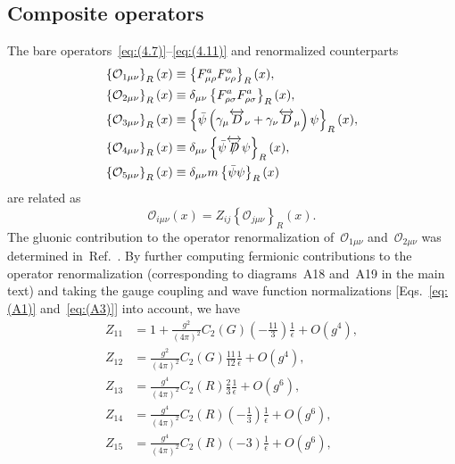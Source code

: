 \subsection{Composite operators}
The bare operators~\eqref{eq:(4.7)}--\eqref{eq:(4.11)} and renormalized
counterparts
\begin{align}
   \left\{\mathcal{O}_{1\mu\nu}\right\}_R(x)&\equiv
   \left\{F_{\mu\rho}^aF_{\nu\rho}^a\right\}_R(x),
\label{eq:(A5)}\\
   \left\{\mathcal{O}_{2\mu\nu}\right\}_R(x)&\equiv
   \delta_{\mu\nu}\left\{F_{\rho\sigma}^aF_{\rho\sigma}^a\right\}_R(x),
\label{eq:(A6)}\\
   \left\{\mathcal{O}_{3\mu\nu}\right\}_R(x)&\equiv
   \left\{\Bar{\psi}
   \left(\gamma_\mu\overleftrightarrow{D}_\nu
   +\gamma_\nu\overleftrightarrow{D}_\mu\right)
   \psi\right\}_R(x),
\label{eq:(A7)}\\
   \left\{\mathcal{O}_{4\mu\nu}\right\}_R(x)&\equiv
   \delta_{\mu\nu}\left\{\Bar{\psi}
   \overleftrightarrow{\Slash{D}}
   \psi\right\}_R(x),
\label{eq:(A8)}\\
   \left\{\mathcal{O}_{5\mu\nu}\right\}_R(x)&\equiv
   \delta_{\mu\nu}m\left\{\Bar{\psi}
   \psi\right\}_R(x)
\label{eq:(A9)}
\end{align}
are related as
\begin{equation}
   \mathcal{O}_{i\mu\nu}(x)
   =Z_{ij}\left\{\mathcal{O}_{j\mu\nu}\right\}_R(x).
\label{eq:(A10)}
\end{equation}
The gluonic contribution to the operator renormalization
of~$\mathcal{O}_{1\mu\nu}$ and~$\mathcal{O}_{2\mu\nu}$ was determined
in~Ref.~\cite{Suzuki:2013gza}. By further computing fermionic contributions to
the operator renormalization (corresponding to diagrams~A18 and~A19 in the main
text) and taking the gauge coupling and wave function normalizations
[Eqs.~\eqref{eq:(A1)} and~\eqref{eq:(A3)}] into account, we have
\begin{align}
   Z_{11}
   &=1+\frac{g^2}{(4\pi)^2}C_2(G)
   \left(-\frac{11}{3}\right)
   \frac{1}{\epsilon}+O(g^4),
\label{eq:(A11)}\\
   Z_{12}
   &=\frac{g^2}{(4\pi)^2}C_2(G)\frac{11}{12}\frac{1}{\epsilon}+O(g^4),
\label{eq:(A12)}\\
   Z_{13}
   &=\frac{g^4}{(4\pi)^2}C_2(R)\frac{2}{3}\frac{1}{\epsilon}+O(g^6),
\label{eq:(A13)}\\
   Z_{14}
   &=\frac{g^4}{(4\pi)^2}C_2(R)\left(-\frac{1}{3}\right)\frac{1}{\epsilon}
   +O(g^6),
\label{eq:(A14)}\\
   Z_{15}
   &=\frac{g^4}{(4\pi)^2}C_2(R)(-3)\frac{1}{\epsilon}+O(g^6),
\label{eq:(A15)}
\end{align}
